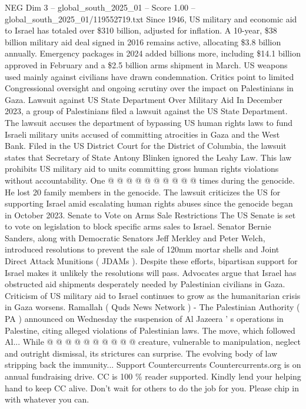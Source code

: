 \begin{textsample}{NEG Dim 3 – global\_south\_2025\_01 – Score 1.00 – global\_south\_2025\_01/119552719.txt}  \label{ex:f3_neg_079}
Since 1946, US military and economic aid to Israel has totaled over \$310 billion, adjusted for inflation.
A 10-year, \$38 billion military aid deal signed in 2016 remains active, allocating \$3.8 billion annually.
Emergency packages in 2024 added billions more, including \$14.1 billion approved in February and a \$2.5 billion arms shipment in March.
US weapons used mainly against civilians have drawn condemnation.
Critics point to limited Congressional oversight and ongoing scrutiny over the impact on Palestinians in Gaza.
Lawsuit against US State Department Over Military Aid In December 2023, a group of Palestinians filed a lawsuit against the US State Department.
The lawsuit accuses the department of bypassing US human rights laws to fund Israeli military units accused of committing atrocities in Gaza and the West Bank.
Filed in the US District Court for the District of Columbia, the lawsuit states that Secretary of State Antony Blinken ignored the Leahy Law.
This law prohibits US military aid to units committing gross human rights violations without accountability.
One @ @ @ @ @ @ @ @ @ @ times during the genocide.
He lost 20 family members in the genocide.
The lawsuit criticizes the US for supporting Israel amid escalating human rights abuses since the genocide began in October 2023.
Senate to Vote on Arms Sale Restrictions The US Senate is set to vote on legislation to block specific arms sales to Israel.
Senator Bernie Sanders, along with Democratic Senators Jeff Merkley and Peter Welch, introduced resolutions to prevent the sale of 120mm mortar shells and Joint Direct Attack Munitions ( JDAMs ).
Despite these efforts, bipartisan support for Israel makes it unlikely the resolutions will pass.
Advocates argue that Israel has obstructed aid shipments desperately needed by Palestinian civilians in Gaza.
Criticism of US military aid to Israel continues to grow as the humanitarian crisis in Gaza worsens.
Ramallah ( Quds News Network ) - The Palestinian Authority ( PA ) announced on Wednesday the suspension of Al Jazeera ' s operations in Palestine, citing alleged violations of Palestinian laws.
The move, which followed Al...
While @ @ @ @ @ @ @ @ @ @ creature, vulnerable to manipulation, neglect and outright dismissal, its strictures can surprise.
The evolving body of law stripping back the immunity...
Support Countercurrents Countercurrents.org is on annual fundraising drive.
CC is 100 \% reader supported.
Kindly lend your helping hand to keep CC alive.
Don't wait for others to do the job for you.
Please chip in with whatever you can.

\end{textsample}
